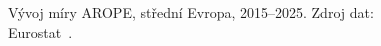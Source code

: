 \def\strStavAropeVyvojTitle{Míra \acs{AROPE}}%
\def\strStavAropeVyvojYlabel{míra \acs{AROPE} [\%]}%
\def\strStavAropeVyvojCaption{\centering Vývoj míry AROPE, střední Evropa, 2015--2025. Zdroj dat: Eurostat~\cite{eurostat_ilc_peps01n_PC_pop}.}%
%
\begin{figure}[htbp]
  \centering
  \resizebox{\linewidth}{!}{}
  \caption{\strStavAropeVyvojCaption}
  \label{fig:stav_arope_vyvoj}
\end{figure}
